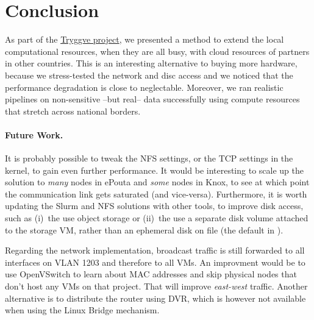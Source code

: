\section{Conclusion}
\label{section:conclusion}

As part of the \href{https://wiki.neic.no/wiki/Tryggve}{Tryggve
  project}, we presented a method to extend the local computational
resources, when they are all busy, with cloud resources of partners in
other countries.
%
This is an interesting alternative to buying more hardware, because we
stress-tested the network and disc access and we noticed that the
performance degradation is close to neglectable.
%
Moreover, we ran realistic pipelines on non-sensitive --but real--
data successfully using compute resources that stretch across national
borders.
%

\paragraph{Future Work.}
%
It is probably possible to tweak the NFS settings, or the TCP settings
in the kernel, to gain even further performance.
%
It would be interesting to scale up the solution to \emph{many} nodes
in ePouta and \emph{some} nodes in Knox, to see
at which point the communication link gets saturated (and vice-versa).
%
Furthermore, it is worth updating the Slurm and NFS solutions with
other tools, to improve disk access, such as (i)~the use object
storage or (ii)~the use a separate disk volume attached to the storage
VM, rather than an ephemeral disk on file (\ie the default in
).

Regarding the network implementation, broadcast traffic is still
forwarded to all interfaces on VLAN 1203 and therefore to all VMs. An
improvment would be to use OpenVSwitch to learn about MAC addresses
and skip physical nodes that don't host any VMs on that project. That
will improve \emph{east-west} traffic. Another alternative is to
distribute the router using DVR, which is however not available when
using the Linux Bridge mechanism.

